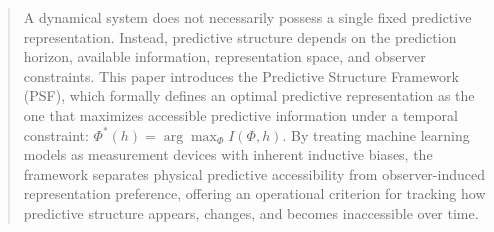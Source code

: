 \begin{abstract}
A dynamical system does not necessarily possess a single fixed predictive representation. Instead, predictive structure depends on the prediction horizon, available information, representation space, and observer constraints. This paper introduces the Predictive Structure Framework (PSF), which formally defines an optimal predictive representation as the one that maximizes accessible predictive information under a temporal constraint: $\Phi^*(h) = \arg\max_\Phi I(\Phi,h)$. By treating machine learning models as measurement devices with inherent inductive biases, the framework separates physical predictive accessibility from observer-induced representation preference, offering an operational criterion for tracking how predictive structure appears, changes, and becomes inaccessible over time.
\end{abstract}
